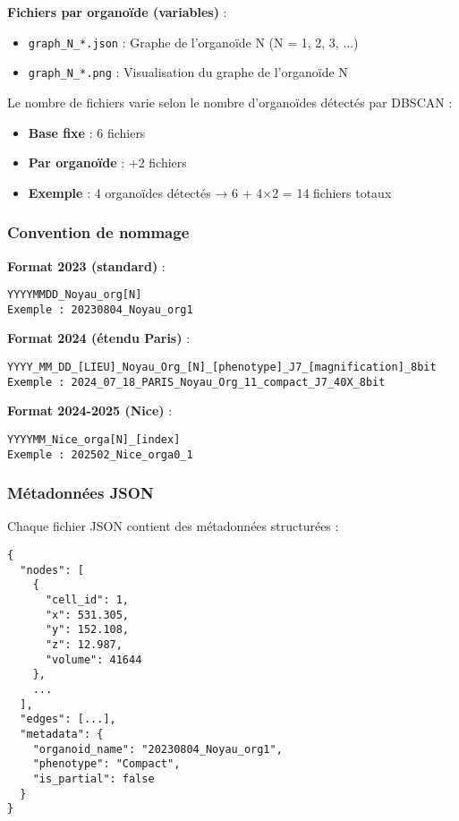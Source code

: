 \textbf{Fichiers par organoïde (variables)} :
\begin{itemize}
    \item \texttt{graph\_N\_*.json} : Graphe de l'organoïde N (N = 1, 2, 3, ...)
    \item \texttt{graph\_N\_*.png} : Visualisation du graphe de l'organoïde N
\end{itemize}

Le nombre de fichiers varie selon le nombre d'organoïdes détectés par DBSCAN :
\begin{itemize}
    \item \textbf{Base fixe} : 6 fichiers
    \item \textbf{Par organoïde} : +2 fichiers
    \item \textbf{Exemple} : 4 organoïdes détectés → 6 + 4×2 = 14 fichiers totaux
\end{itemize}

\subsubsection{Convention de nommage}

\textbf{Format 2023 (standard)} :
\begin{verbatim}
YYYYMMDD_Noyau_org[N]
Exemple : 20230804_Noyau_org1
\end{verbatim}

\textbf{Format 2024 (étendu Paris)} :
\begin{verbatim}
YYYY_MM_DD_[LIEU]_Noyau_Org_[N]_[phenotype]_J7_[magnification]_8bit
Exemple : 2024_07_18_PARIS_Noyau_Org_11_compact_J7_40X_8bit
\end{verbatim}

\textbf{Format 2024-2025 (Nice)} :
\begin{verbatim}
YYYYMM_Nice_orga[N]_[index]
Exemple : 202502_Nice_orga0_1
\end{verbatim}

\subsubsection{Métadonnées JSON}

Chaque fichier JSON contient des métadonnées structurées :

\begin{verbatim}
{
  "nodes": [
    {
      "cell_id": 1,
      "x": 531.305,
      "y": 152.108,
      "z": 12.987,
      "volume": 41644
    },
    ...
  ],
  "edges": [...],
  "metadata": {
    "organoid_name": "20230804_Noyau_org1",
    "phenotype": "Compact",
    "is_partial": false
  }
}
\end{verbatim}

